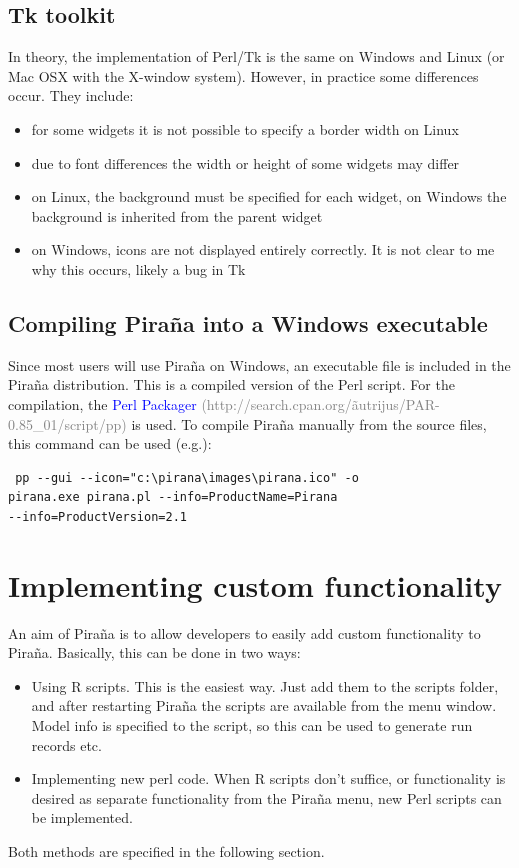 \documentclass[a4,11pt]{report}
\begin{document}
\subsection{Tk toolkit} In theory, the implementation of Perl/Tk is
the same on Windows and Linux (or Mac OSX with the X-window
system). However, in practice some differences occur. They include:
\begin{itemize}
  \item for some widgets it is not possible to specify a border width
on Linux
  \item due to font differences the width or height of some widgets
may differ
  \item on Linux, the background must be specified for each widget, on
Windows the background is inherited from the parent widget
  \item on Windows, icons are not displayed entirely correctly. It is
not clear to me why this occurs, likely a bug in Tk
\end{itemize}

\subsection{Compiling Pira\~na into a Windows executable} Since most
users will use Pira\~na on Windows, an executable file is included in
the Pira\~na distribution. This is a compiled version of the Perl
script. For the compilation, the \textcolor{Blue}{Perl Packager}
\textcolor{Grey}{(http://search.cpan.org/\~autrijus/PAR-0.85\_01/script/pp)}
is used. To compile Pira\~na manually from the source files, this
command can be used (e.g.):

\begin{verbatim} pp --gui --icon="c:\pirana\images\pirana.ico" -o
pirana.exe pirana.pl --info=ProductName=Pirana
--info=ProductVersion=2.1
\end{verbatim}



\section{Implementing custom functionality}

An aim of Pira\~na is to allow developers to easily add custom
functionality to Pira\~na. Basically, this can be done in two ways:
\begin{itemize}
  \item Using R scripts. This is the easiest way. Just add them to the
    scripts folder, and after restarting Pira\~na the scripts are
    available from the menu window. Model info is specified to the
    script, so this can be used to generate run records etc.
  \item Implementing new perl code. When R scripts don't suffice, or
    functionality is desired as separate functionality from the
    Pira\~na menu, new Perl scripts can be implemented.
\end{itemize}
Both methods are specified in the following section.
\end{document}
